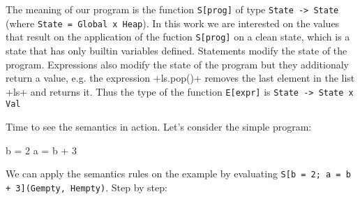 The meaning of our program is the function \verb+S[prog]+ of type \verb+State -> State+
(where \verb|State = Global x Heap|).
In this work we are interested on the values that result on the application of the fuction
\verb+S[prog]+ on a clean state, which is a state that has only builtin variables defined.
Statements modify the state of the program. Expressions also modify the state of the
program but they additionaly return a value, e.g. the expression \pycode+ls.pop()+ removes
the last element in the list \pycode+ls+ and returns it. Thus the type of the function
\verb+E[expr]+ is \verb+State -> State x Val+

Time to see the semantics in action. Let's consider the simple program:

\begin{pythoncode}
b = 2
a = b + 3
\end{pythoncode}

We can apply the semantics rules on the example by evaluating
\verb|S[b = 2; a = b + 3](Gempty, Hempty)|. Step by step:

